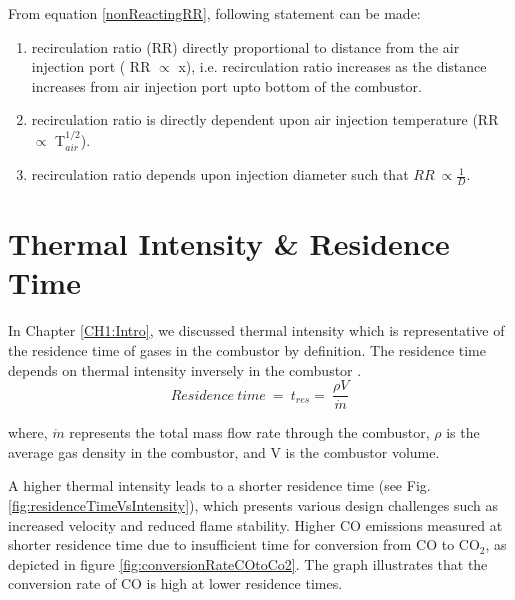 From equation \ref{nonReactingRR}, following statement can be made:
\begin{enumerate}
    \item recirculation ratio (RR) directly proportional to distance from the air injection port ( RR $\propto$ x), i.e. recirculation ratio increases as the distance increases from air injection port upto bottom of the combustor.
    \item recirculation ratio is directly dependent upon air injection temperature (RR $\propto$ T$_{air}^{1/2}$).
    \item recirculation ratio depends upon injection diameter such that $RR\ \propto \frac{1}{D}$.
\end{enumerate}

\section{Thermal Intensity \& Residence Time}
In Chapter \ref{CH1:Intro}, we discussed thermal intensity which is representative of the residence time of gases in the combustor by definition. The residence time depends on thermal intensity inversely in the combustor \cite{VAThesis2011}. 
\begin{equation}\label{residenceTime}
    Residence\ time\ = \ t_{res} = \ \frac{\rho V}{\dot{m}}
\end{equation}

where, $\dot{m}$ represents the total mass flow rate through the combustor, $\rho$ is the average gas density in the combustor, and V is the combustor volume.

A higher thermal intensity leads to a shorter residence time (see Fig. \ref{fig:residenceTimeVsIntensity}), which presents various design challenges such as increased velocity and reduced flame stability. Higher CO emissions measured at shorter residence time due to insufficient time for conversion from CO to CO$_2$, as depicted in figure \ref{fig:conversionRateCOtoCo2}. The graph illustrates that the conversion rate of CO is high at lower residence times.

